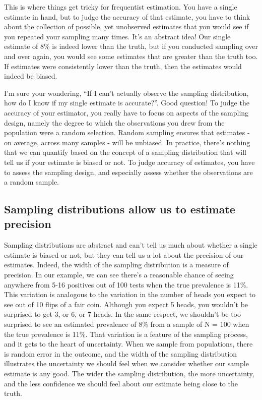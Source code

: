 \documentclass[
]{book}
\begin{document}
This is where things get tricky for frequentist estimation. You have a single estimate in hand, but to judge the accuracy of that estimate, you have to think about the collection of possible, yet unobserved estimates that you would see if you repeated your sampling many times. It's an abstract idea! Our single estimate of 8\% is indeed lower than the truth, but if you conducted sampling over and over again, you would see some estimates that are greater than the truth too. If estimates were consistently lower than the truth, then the estimates would indeed be biased.

I'm sure your wondering, ``If I can't actually observe the sampling distribution, how do I know if my single estimate is accurate?''. Good question! To judge the accuracy of your estimator, you really have to focus on aspects of the sampling design, namely the degree to which the observations you drew from the population were a random selection. Random sampling ensures that estimates - on average, across many samples - will be unbiased. In practice, there's nothing that we can quantify based on the concept of a sampling distribution that will tell us if your estimate is biased or not. To judge accuracy of estimates, you have to assess the sampling design, and especially assess whether the observations are a random sample.

\subsection{Sampling distributions allow us to estimate precision}\label{sampling-distributions-allow-us-to-estimate-precision}

Sampling distributions are abstract and can't tell us much about whether a single estimate is biased or not, but they can tell us a lot about the precision of our estimates. Indeed, the width of the sampling distribution is a measure of precision. In our example, we can see there's a reasonable chance of seeing anywhere from 5-16 positives out of 100 tests when the true prevalence is 11\%. This variation is analogous to the variation in the number of heads you expect to see out of 10 flips of a fair coin. Although you expect 5 heads, you wouldn't be surprised to get 3, or 6, or 7 heads. In the same respect, we shouldn't be too surprised to see an estimated prevalence of 8\% from a sample of N = 100 when the true prevalence is 11\%. That variation is a feature of the sampling process, and it gets to the heart of uncertainty. When we sample from populations, there is random error in the outcome, and the width of the sampling distribution illustrates the uncertainty we should feel when we consider whether our sample estimate is any good. The wider the sampling distribution, the more uncertainty, and the less confidence we should feel about our estimate being close to the truth.
\end{document}
